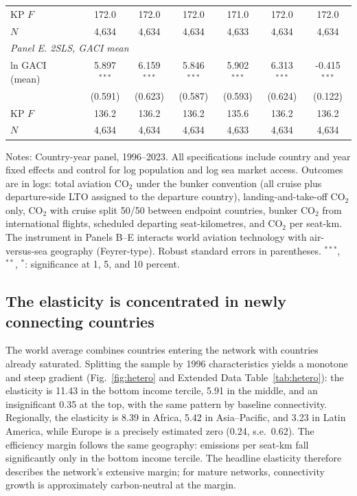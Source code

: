 \documentclass[12pt]{article}
\begin{document}
\begin{table}[htbp]
\begin{threeparttable}
\begin{tabular}{lcccccc}
  KP $F$ & 172.0 & 172.0 & 172.0 & 171.0 & 172.0 & 172.0 \\
  $N$ & 4,634 & 4,634 & 4,634 & 4,633 & 4,634 & 4,634 \\
\midrule
\multicolumn{7}{l}{\textit{Panel E. 2SLS, GACI mean}} \\
  ln GACI (mean) & 5.897$^{***}$ & 6.159$^{***}$ & 5.846$^{***}$ & 5.902$^{***}$ & 6.313$^{***}$ & -0.415$^{***}$ \\
   & (0.591) & (0.623) & (0.587) & (0.593) & (0.624) & (0.122) \\
  KP $F$ & 136.2 & 136.2 & 136.2 & 135.6 & 136.2 & 136.2 \\
  $N$ & 4,634 & 4,634 & 4,634 & 4,633 & 4,634 & 4,634 \\
\bottomrule
\end{tabular}
\begin{tablenotes}[flushleft]
\footnotesize
\item Notes: Country-year panel, 1996--2023. All specifications include country and year fixed effects and control for log population and log sea market access. Outcomes are in logs: total aviation CO$_2$ under the bunker convention (all cruise plus departure-side LTO assigned to the departure country), landing-and-take-off CO$_2$ only, CO$_2$ with cruise split 50/50 between endpoint countries, bunker CO$_2$ from international flights, scheduled departing seat-kilometres, and CO$_2$ per seat-km. The instrument in Panels B--E interacts world aviation technology with air-versus-sea geography (Feyrer-type). Robust standard errors in parentheses. $^{***}$, $^{**}$, $^{*}$: significance at 1, 5, and 10 percent.
\end{tablenotes}
\end{threeparttable}
\end{table}

\subsection*{The elasticity is concentrated in newly connecting countries}
The world average combines countries entering the network with countries
already saturated. Splitting the sample by 1996 characteristics yields a
monotone and steep gradient (Fig.~\ref{fig:hetero} and Extended Data
Table~\ref{tab:hetero}): the elasticity is 11.43 in the bottom income
tercile, 5.91 in the middle, and an insignificant 0.35 at the top, with the
same pattern by baseline connectivity. Regionally, the elasticity is 8.39
in Africa, 5.42 in Asia--Pacific, and 3.23 in Latin America, while Europe
is a precisely estimated zero (0.24, s.e.\ 0.62). The efficiency margin
follows the same geography: emissions per seat-km fall significantly only
in the bottom income tercile. The headline elasticity therefore describes
the network's extensive margin; for mature networks, connectivity growth is
approximately carbon-neutral at the margin.
\end{document}
